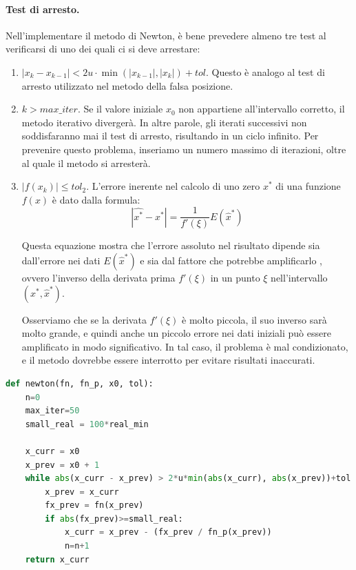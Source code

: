 \documentclass{article}
\begin{document}
\paragraph{Test di arresto.} Nell'implementare il metodo di Newton, è bene
prevedere almeno tre test al verificarsi di uno dei quali ci si deve
arrestare:
\begin{enumerate}
    \item $|x_k-x_{k-1}|<2u\cdot\min(\left\lvert x_{k-1} \right\rvert,
        \left\lvert x_k\right\rvert)+tol$. Questo è analogo al test di arresto
        utilizzato nel metodo della falsa posizione.
    \item $k>max\_iter$. Se il valore iniziale $x_0$ non appartiene
        all'intervallo corretto, il metodo iterativo divergerà. In altre
        parole, gli iterati successivi non soddisfaranno mai il test di arresto,
        risultando in un ciclo infinito. Per prevenire questo problema,
        inseriamo un numero massimo di iterazioni, oltre al quale il metodo si
        arresterà.
    \item $\left\lvert f(x_k)\right\rvert\leq tol_{2}$. 
        L'errore inerente nel calcolo di uno zero $x^*$ di una
        funzione $f(x)$ è dato dalla formula: 
        $$\left\lvert \hat{x^*}-x^*\right\rvert=\frac{1}{f'(\xi)}E(\hat{x}^*)$$

        Questa equazione mostra che l'errore assoluto nel risultato dipende
        sia dall'errore nei dati $E(\hat{x}^*)$ e sia dal fattore che potrebbe
        amplificarlo , ovvero l'inverso della derivata prima $f'(\xi)$
        in un punto $\xi$ nell'intervallo $(x^*,\hat{x}^*)$.

        Osserviamo che se la derivata $f'(\xi)$ è molto piccola, il suo
        inverso sarà molto grande, e quindi anche un piccolo errore nei dati
        iniziali può essere amplificato in modo significativo. In tal caso, il
        problema è mal condizionato, e il metodo dovrebbe essere interrotto
        per evitare risultati inaccurati.
\end{enumerate}
\begin{lstlisting}[language=Python]
def newton(fn, fn_p, x0, tol):
    n=0
    max_iter=50
    small_real = 100*real_min
    
    x_curr = x0
    x_prev = x0 + 1
    while abs(x_curr - x_prev) > 2*u*min(abs(x_curr), abs(x_prev))+tol and n < max_iter:
        x_prev = x_curr
        fx_prev = fn(x_prev)
        if abs(fx_prev)>=small_real:
            x_curr = x_prev - (fx_prev / fn_p(x_prev))
            n=n+1
    return x_curr
\end{lstlisting}
\end{document}
